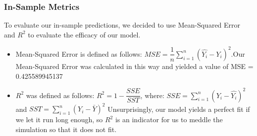 \documentclass[letterpaper]{article}
\begin{document}
\subsubsection{In-Sample Metrics}
To evaluate our in-sample predictions, we decided to use Mean-Squared Error and $R^2$ to evaluate the efficacy of our model.
\begin{itemize}
\item Mean-Squared Error is defined as follows: $MSE = \dfrac{1}{n}\sum_{i=1}^{n}(\hat{Y_{i}} - Y_i)^2$.\newline Our Mean-Squared Error was calculated in this way and yielded a value of MSE = 0.425589945137
\item $R^2$ was defined as follows: $R^2 = 1 - \dfrac{SSE}{SST}$, where:
\newline $SSE = \sum_{i=1}^{n} (Y_i - \hat{Y_i})^2$ and $SST = \sum_{i=1}^{n} (Y_i - \bar{Y})^2$
Unsurprisingly, our model yields a perfect fit if we let it run long enough, so $R^2$ is an indicator for us to meddle the simulation so that it does not fit.
\end{itemize}

\end{document}
